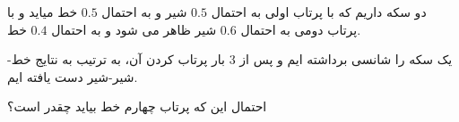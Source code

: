 دو سکه داریم که با پرتاب اولی به احتمال
$0.5$
شیر و به احتمال
$0.5$
خط میاید 
و با پرتاب دومی به احتمال $0.6$ شیر ظاهر می شود و به احتمال $0.4$ خط.

یک سکه را شانسی برداشته ایم و پس از 3 بار پرتاب کردن آن، به ترتیب به نتایج خط-شیر-شیر دست یافته ایم.

احتمال این که پرتاب چهارم خط بیاید چقدر است؟
\\
